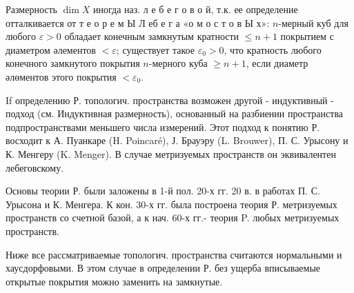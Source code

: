 \documentclass[10pt]{article}
\begin{document}
Размерность $\operatorname{dim} X$ иногда наз. л е б е г о в о й, т.к. ее определение отталкивается от т е о р е м Ы Л еб е г а «о м о с т о в Ы х»: $n$-мерный куб для любого $\varepsilon>0$ обладает конечным замкнутым кратности $\leqslant n+1$ покрытием с диаметром әлементов $<\varepsilon$; существует такое $\varepsilon_{0}>0$, что кратность любого конечного замкнутого покрытия $n$-мерного куба $\geqslant n+1$, если диаметр әлөментов этого покрытия $<\varepsilon_{0}$.



If определению Р. топологич. пространства возможен другой - индуктивный - подход (см. Индуктивная размерность), основанный на разбиении пространства подпространствами меньшего числа измерений. Этот подход к понятию Р. восходит к А. Пуанкаре (H. Poincaré), Ј. Брауэру (L. Brouwer), П. С. Урысону и К. Менгеру (K. Menger). В случае метризуемых пространств он эквивалентен лебеговскому.



Основы теории Р. были заложены в 1-й пол. 20-х гг. 20 в. в работах П. С. Урысона и К. Менгера. К кон. 30-х гг. была построена теория Р. метризуемых пространств со счетной базой, а к нач. 60-х гг.- теория P. любых метризуемых пространств.



Ниже все рассматриваемые топологич. пространства считаются нормальными и хаусдорфовыми. В этом случае в определении Р. без ущерба вписываемые открытые покрытия можно заменить на замкнутые.
\end{document}

